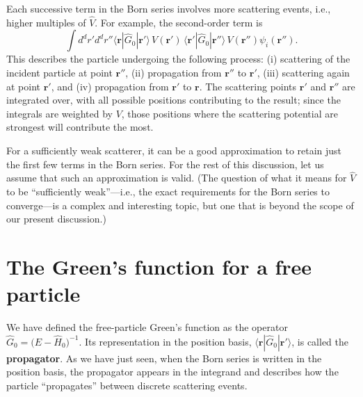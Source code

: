 \documentclass[pra,12pt]{revtex4}
\begin{document}
\noindent
Each successive term in the Born series involves more scattering
events, i.e., higher multiples of $\hat{V}$.  For example, the
second-order term is
\begin{equation*}
  \int d^dr' d^dr'' \langle \mathbf{r} | \hat{G}_0 |\mathbf{r}'\rangle\, V(\mathbf{r}') \, \langle \mathbf{r}' | \hat{G}_0 |\mathbf{r}''\rangle \, V(\mathbf{r}'') \psi_i(\mathbf{r}'').
\end{equation*}
This describes the particle undergoing the following process: (i)
scattering of the incident particle at point $\mathbf{r}''$, (ii)
propagation from $\mathbf{r}''$ to $\mathbf{r}'$, (iii) scattering
again at point $\mathbf{r}'$, and (iv) propagation from $\mathbf{r}'$
to $\mathbf{r}$.  The scattering points $\mathbf{r}'$ and
$\mathbf{r}''$ are integrated over, with all possible positions
contributing to the result; since the integrals are weighted by $V$,
those positions where the scattering potential are strongest will
contribute the most.

For a sufficiently weak scatterer, it can be a good approximation to
retain just the first few terms in the Born series.  For the rest of
this discussion, let us assume that such an approximation is valid.
(The question of what it means for $\hat{V}$ to be ``sufficiently
weak''---i.e., the exact requirements for the Born series to
converge---is a complex and interesting topic, but one that is beyond
the scope of our present discussion.)

\section{The Green's function for a free particle}
\label{sec:freegreen}

We have defined the free-particle Green's function as the operator
$\hat{G}_0=\big(E-\hat{H}_0\big)^{-1}$.  Its representation in the
position basis, $\langle\mathbf{r}|\hat{G}_0|\mathbf{r}'\rangle$, is
called the \textbf{propagator}.  As we have just seen, when the Born
series is written in the position basis, the propagator appears in the
integrand and describes how the particle ``propagates'' between
discrete scattering events.
\end{document}
